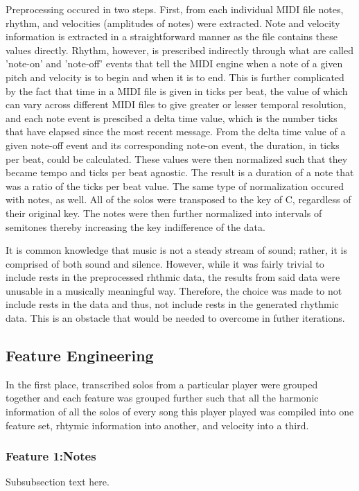 \documentclass[conference]{IEEEtran}
\begin{document}
Preprocessing occured in two steps. First, from each individual MIDI file notes, rhythm, and velocities (amplitudes of notes) were extracted. Note and velocity information is extracted in a straightforward manner as the file contains these values directly. Rhythm, however, is prescribed indirectly through what are called 'note-on' and 'note-off' events that tell the MIDI engine when a note of a given pitch and velocity is to begin and when it is to end. This is further complicated by the fact that time in a MIDI file is given in ticks per beat, the value of which can vary across different MIDI files to give greater or lesser temporal resolution, and each note event is prescibed a delta time value, which is the number ticks that have elapsed since the most recent message. From the delta time value of a given note-off event and its corresponding note-on event, the duration, in ticks per beat, could be calculated. These values were then normalized such that they became tempo and ticks per beat agnostic. The result is a duration of a note that was a ratio of the ticks per beat value. The same type of normalization occured with notes, as well. All of the solos were transposed to the key of C, regardless of their original key. The notes were then further normalized into intervals of semitones thereby increasing the key indifference of the data.

It is common knowledge that music is not a steady stream of sound; rather, it is comprised of both sound and silence. However, while it was fairly trivial to include rests in the preprocessed rhthmic data, the results from said data were unusable in a musically meaningful way. Therefore, the choice was made to not include rests in the data and thus, not include rests in the generated rhythmic data. This is an obstacle that would be needed to overcome in futher iterations.

\subsection{Feature Engineering} \label{Feature Engineering}
In the first place, transcribed solos from a particular player were grouped together and each feature was grouped further such that all the harmonic information of all the solos of every song this player played was compiled into one feature set, rhtymic information into another, and velocity into a third.

\subsubsection{Feature 1:Notes} \label{f1notes}
Subsubsection text here.
\end{document}
